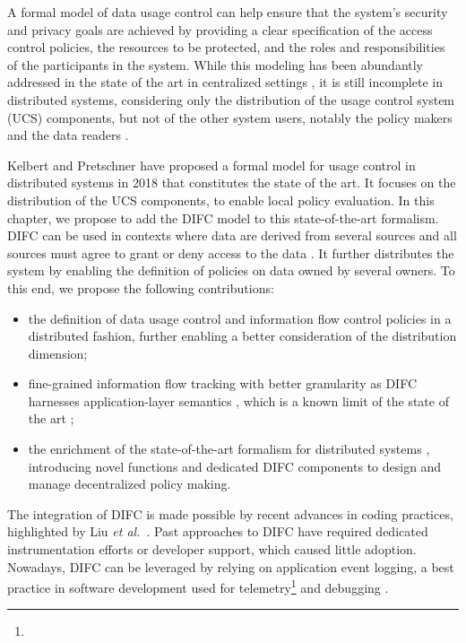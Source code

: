 A formal model of data usage control can help ensure that the system's security and privacy goals are achieved by providing a clear specification of the access control policies, the resources to be protected, and the roles and responsibilities of the participants in the system. While this modeling has been abundantly addressed in the state of the art in centralized settings \cite{Pretschner2011, Kelbert2013, Kelbert2014, Fromm2020}, it is still incomplete in distributed systems, considering only the distribution of the usage control system (UCS) components, but not of the other system users, notably the policy makers and the data readers \cite{Kelbert2015, Kelbert2018}.

Kelbert and Pretschner have proposed a formal model for usage control in distributed systems in 2018 \cite{Kelbert2018} that constitutes the state of the art. It focuses on the distribution of the UCS components, to enable local policy evaluation.
In this chapter, we propose to add the DIFC model \cite{Myers1997} to this state-of-the-art formalism. DIFC can be used in contexts where data are derived from several sources and all sources must agree to grant or deny access to the data \cite{Myers1997}. It further distributes the system by enabling the definition of policies on data owned by several owners. To this end, we propose the following contributions:

\begin{itemize}
    \item the definition of data usage control and information flow control policies in a distributed fashion, further enabling a better consideration of the distribution dimension; 
    \item fine-grained information flow tracking with better granularity as DIFC harnesses application-layer semantics \cite{Liu2022}, which is a known limit of the state of the art \cite{Kelbert2018};
    \item the enrichment of the state-of-the-art formalism for distributed systems \cite{Kelbert2018}, introducing novel functions and dedicated DIFC components to design and manage decentralized policy making.
\end{itemize}

The integration of DIFC is made possible by recent advances in coding practices, highlighted by Liu \emph{et al.}~\cite{Liu2022}. Past approaches to DIFC have required dedicated instrumentation efforts or developer support, which caused little adoption. Nowadays, DIFC can be leveraged by relying on application event logging, a best practice in software development used for telemetry\footnote{} and debugging \cite{Liu2022}.

